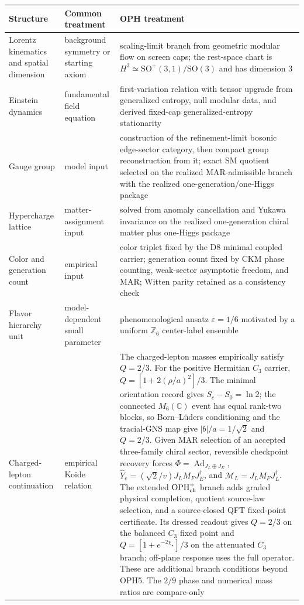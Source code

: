 \documentclass[11pt]{article}
\begin{document}
\begingroup
\footnotesize
\begin{longtable}{@{}>{\raggedright\arraybackslash}p{}>{\raggedright\arraybackslash}p{}>{\raggedright\arraybackslash}p{}@{}}
\toprule
Structure & Common treatment & OPH treatment \\
\midrule
\endhead
Lorentz kinematics and spatial dimension & background symmetry or starting axiom & scaling-limit branch from geometric modular flow on screen caps; the rest-space chart is \(H^3\simeq\mathrm{SO}^+(3,1)/\mathrm{SO}(3)\) and has dimension \(3\) \\
Einstein dynamics & fundamental field equation & first-variation relation with tensor upgrade from generalized entropy, null modular data, and derived fixed-cap generalized-entropy stationarity \\
Gauge group & model input & construction of the refinement-limit bosonic edge-sector category, then compact group reconstruction from it; exact SM quotient selected on the realized MAR-admissible branch with the realized one-generation/one-Higgs package \\
Hypercharge lattice & matter-assignment input & solved from anomaly cancellation and Yukawa invariance on the realized one-generation chiral matter plus one-Higgs package \\
Color and generation count & empirical input & color triplet fixed by the D8 minimal coupled carrier; generation count fixed by CKM phase counting, weak-sector asymptotic freedom, and MAR; Witten parity retained as a consistency check \\
Flavor hierarchy unit & model-dependent small parameter & phenomenological ansatz \(\varepsilon=1/6\) motivated by a uniform \(\mathbb Z_6\) center-label ensemble \\
Charged-lepton continuation & empirical Koide relation & The charged-lepton masses empirically satisfy \(Q=2/3\). For the positive Hermitian \(C_3\) carrier, \(Q=[1+2(\rho/a)^2]/3\). The minimal orientation record gives \(S_c-S_0=\ln2\); the connected \(M_6(\mathbb C)\) event has equal rank-two blocks, so Born--L\"uders conditioning and the tracial-GNS map give \(|b|/a=1/\sqrt2\) and \(Q=2/3\). Given MAR selection of an accepted three-family chiral sector, reversible checkpoint recovery forces \(\Phi=\operatorname{Ad}_{J_L\oplus J_E}\), \(\widehat Y_e=(\sqrt2/v)J_LM_FJ_E^\dagger\), and \(\mathcal M_L=J_LM_FJ_L^\dagger\). The extended \(\mathrm{OPH}^{+}_{\rm ch}\) branch adds graded physical completion, quotient source-law selection, and a source-closed QFT fixed-point certificate. Its dressed readout gives \(Q=2/3\) on the balanced \(C_3\) fixed point and \(Q=[1+e^{-2\chi_\star}]/3\) on the attenuated \(C_3\) branch; off-plane response uses the full operator. These are additional branch conditions beyond OPH5. The \(2/9\) phase and numerical mass ratios are compare-only \\

\end{longtable}
\end{document}
